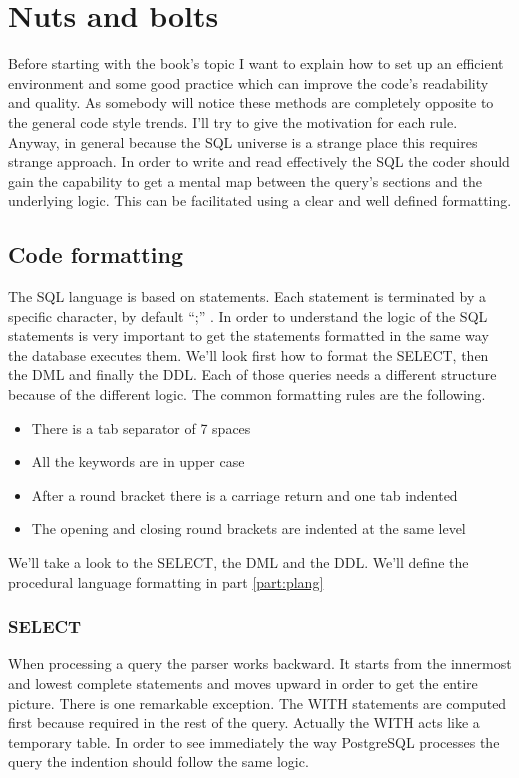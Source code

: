 \chapter{Nuts and bolts}
Before starting with the book's topic I want to explain how to set up an
efficient environment and some good practice which can improve the code's readability and quality.
As somebody will notice these methods are completely opposite to the general code style trends. I'll 
try to give the motivation for each rule. Anyway, in general because the SQL universe is a strange 
place this requires strange approach. In order to write and read effectively the SQL the coder should gain 
the capability to get a mental map  between the query's sections and the underlying logic. This can be 
facilitated using a clear and well defined formatting.\newline

\section{Code formatting}
The SQL language is based on statements. Each statement is terminated by a specific character, by default ``;'' . 
In order to understand the logic of the SQL statements is very important to get the statements formatted in the same 
way the database executes them. We'll look first how to format the SELECT, then the DML and finally the DDL. Each of 
those queries needs a different structure because of the different logic. The common formatting rules are the following.

\begin{itemize}
 \item There is a tab separator of 7 spaces
 \item All the keywords are in upper case
 \item After a round bracket there is a carriage return and one tab indented 
 \item The opening and closing round brackets are indented at the same level
\end{itemize}

We'll take a look to the SELECT, the DML and the DDL. We'll define the procedural language formatting in part 
\ref{part:plang}


\subsection{SELECT}
\label{sub:FRMSELECT}
When processing a query the parser works backward. It starts from the innermost and lowest complete statements and 
moves upward in order to get the entire picture. There is one remarkable exception. The WITH statements are computed 
first because required in the rest of the query. Actually the WITH acts like a temporary table. In order to see 
immediately the way PostgreSQL processes the query the indention should follow the same logic. \newline


